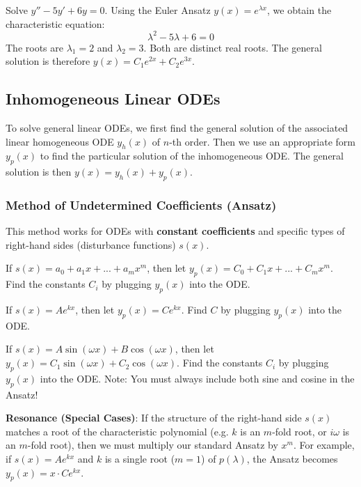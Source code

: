 \begin{example}
    Solve $y'' - 5y' + 6y = 0$. 
    Using the Euler Ansatz $y(x) = e^{\lambda x}$, we obtain the characteristic equation:
    $$\lambda^2 - 5\lambda + 6 = 0$$
    The roots are $\lambda_1 = 2$ and $\lambda_2 = 3$. Both are distinct real roots.
    The general solution is therefore $y(x) = C_1 e^{2x} + C_2 e^{3x}$.
\end{example}


\subsection{Inhomogeneous Linear ODEs}

\begin{lemma}
    To solve general linear ODEs, we first find the general solution of the associated linear homogeneous ODE $y_h(x)$ of $n$-th order. Then we use an appropriate form $y_p(x)$ to find the particular solution of the inhomogeneous ODE. The general solution is then $y(x) = y_h(x) + y_p(x)$.
\end{lemma}

\subsubsection{Method of Undetermined Coefficients (Ansatz)}
This method works for ODEs with \textbf{constant coefficients} and specific types of right-hand sides (disturbance functions) $s(x)$.

\begin{theorem}
    If $s(x) = a_0 + a_1x + ... + a_mx^m$, then let $y_p(x) = C_0 + C_1x + ... + C_mx^m$. Find the constants $C_i$ by plugging $y_p(x)$ into the ODE.
\end{theorem}

\begin{theorem}
    If $s(x) = A e^{kx}$, then let $y_p(x) = C e^{kx}$. Find $C$ by plugging $y_p(x)$ into the ODE.
\end{theorem}

\begin{theorem}
    If $s(x) = A \sin(\omega x) + B \cos(\omega x)$, then let $y_p(x) = C_1 \sin(\omega x) + C_2 \cos(\omega x)$. Find the constants $C_i$ by plugging $y_p(x)$ into the ODE. Note: You must always include both sine and cosine in the Ansatz!
\end{theorem}

\begin{important}
    \textbf{Resonance (Special Cases)}: If the structure of the right-hand side $s(x)$ matches a root of the characteristic polynomial (e.g. $k$ is an $m$-fold root, or $i \omega$ is an $m$-fold root), then we must multiply our standard Ansatz by $x^m$. For example, if $s(x) = A e^{kx}$ and $k$ is a single root ($m=1$) of $p(\lambda)$, the Ansatz becomes $y_p(x) = x \cdot C e^{kx}$.
\end{important}

